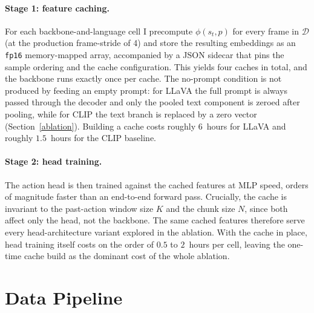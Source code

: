 \paragraph{Stage 1: feature caching.} For each backbone-and-language cell I
precompute $\phi(s_t, p)$ for every frame in $\mathcal{D}$ (at the production
frame-stride of 4) and store the resulting embeddings as an \texttt{fp16}
memory-mapped array, accompanied by a JSON sidecar that pins the sample
ordering and the cache configuration. This yields four caches in total, and
the backbone runs exactly once per cache. The no-prompt condition is not
produced by feeding an empty prompt: for LLaVA the full prompt is always
passed through the decoder and only the pooled text component is zeroed after
pooling, while for CLIP the text branch is replaced by a zero vector
(Section~\ref{ablation}). Building a cache costs roughly $6$~hours for LLaVA
and roughly $1.5$~hours for the CLIP baseline.

\paragraph{Stage 2: head training.} The action head is then trained against
the cached features at MLP speed, orders of magnitude faster than an
end-to-end forward pass. Crucially, the cache is invariant to the past-action
window size $K$ and the chunk size $N$, since both affect only the head, not
the backbone. The same cached features therefore serve every head-architecture
variant explored in the ablation. With the cache in place, head training
itself costs on the order of $0.5$ to $2$~hours per cell, leaving the
one-time cache build as the dominant cost of the whole ablation.

\section{Data Pipeline}

